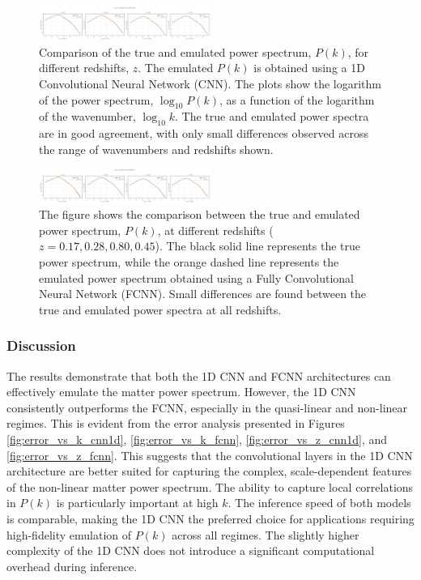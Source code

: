 \documentclass[twocolumn]{aastex631}
\begin{document}
\begin{figure}[h]
    \centering
    \includegraphics[width=0.5\textwidth]{plots/true_vs_emulated_cnn1d_1_1745408311.png}
    \caption{\label{fig:true_vs_emulated_cnn1d}Comparison of the true and emulated power spectrum, $P(k)$, for different redshifts, $z$. The emulated $P(k)$ is obtained using a 1D Convolutional Neural Network (CNN). The plots show the logarithm of the power spectrum, $\log_{10} P(k)$, as a function of the logarithm of the wavenumber, $\log_{10} k$. The true and emulated power spectra are in good agreement, with only small differences observed across the range of wavenumbers and redshifts shown.}
\end{figure}

\begin{figure}[h]
    \centering
    \includegraphics[width=0.5\textwidth]{plots/true_vs_emulated_fcnn_2_1745408315.png}
    \caption{\label{fig:true_vs_emulated_fcnn}The figure shows the comparison between the true and emulated power spectrum, $P(k)$, at different redshifts ($z=0.17, 0.28, 0.80, 0.45$). The black solid line represents the true power spectrum, while the orange dashed line represents the emulated power spectrum obtained using a Fully Convolutional Neural Network (FCNN). Small differences are found between the true and emulated power spectra at all redshifts.}
\end{figure}

\subsubsection{Discussion}

The results demonstrate that both the 1D CNN and FCNN architectures can effectively emulate the matter power spectrum. However, the 1D CNN consistently outperforms the FCNN, especially in the quasi-linear and non-linear regimes. This is evident from the error analysis presented in Figures \ref{fig:error_vs_k_cnn1d}, \ref{fig:error_vs_k_fcnn}, \ref{fig:error_vs_z_cnn1d}, and \ref{fig:error_vs_z_fcnn}. This suggests that the convolutional layers in the 1D CNN architecture are better suited for capturing the complex, scale-dependent features of the non-linear matter power spectrum. The ability to capture local correlations in $P(k)$ is particularly important at high $k$. The inference speed of both models is comparable, making the 1D CNN the preferred choice for applications requiring high-fidelity emulation of $P(k)$ across all regimes. The slightly higher complexity of the 1D CNN does not introduce a significant computational overhead during inference.
\end{document}
